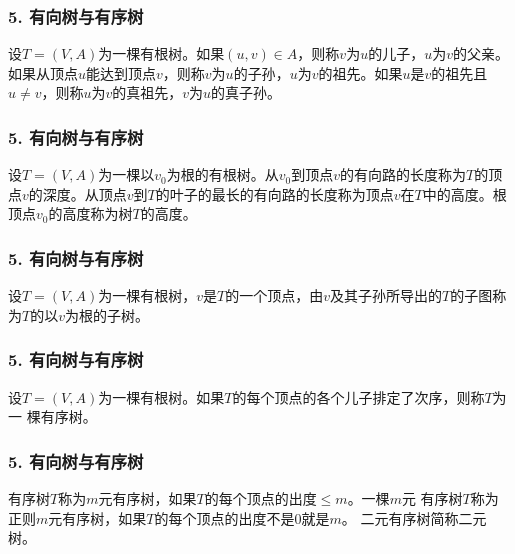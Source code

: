 \documentclass{beamer}
\begin{document}
\begin{CJK*}{UTF8}{gbsn}
\begin{frame}
  \frametitle{5. 有向树与有序树}
  \begin{Def}\justifying\let\raggedright\justifying
  设$T=(V,A)$为一棵有根树。如果$(u,v)\in A$，则称$v$为$u$的\alert{儿子}，$u$为$v$的\alert{父亲}。如果从顶点$u$能达到顶点$v$，则称$v$为$u$的\alert{子孙}，$u$为$v$的\alert{祖先}。如果$u$是$v$的祖先且$u \neq v$，则称$u$为$v$的\alert{真祖先}，$v$为$u$的\alert{真子孙}。
  \end{Def}
\end{frame}

\begin{frame}
  \frametitle{5. 有向树与有序树}
  \begin{Def}\justifying\let\raggedright\justifying
    设$T=(V,A)$为一棵以$v_0$为根的有根树。从$v_0$到顶点$v$的有向路的长度称为$T$的顶点$v$的\alert{深度}。从顶点$v$到$T$的叶子的最长的有向路的长度称为顶点$v$在$T$中的\alert{高度}。根顶点$v_0$的高度称为树$T$的\alert{高度}。
  \end{Def}
\end{frame}

\begin{frame}
  \frametitle{5. 有向树与有序树}
  \begin{Def}\justifying\let\raggedright\justifying
    设$T=(V,A)$为一棵有根树，$v$是$T$的一个顶点，由$v$及其子孙所导出的$T$的子图称为$T$的以$v$为根的\alert{子树}。
  \end{Def}
\end{frame}

\begin{frame}
  \frametitle{5. 有向树与有序树}
  \begin{Def}
    设$T=(V,A)$为一棵有根树。如果$T$的每个顶点的各个儿子排定了次序，则称$T$为一
    棵\alert{有序树}。
  \end{Def}
\end{frame}

\begin{frame}
  \frametitle{5. 有向树与有序树}
  \begin{Def}
    有序树$T$称为\alert{$m$元有序树}，如果$T$的每个顶点的出度$\leq m$。一棵$m$元
    有序树$T$称为\alert{正则$m$元有序树}，如果$T$的每个顶点的出度不是$0$就是$m$。
    二元有序树简称\alert{二元树}。
  \end{Def}
\end{frame}


\end{CJK*}
\end{document}
